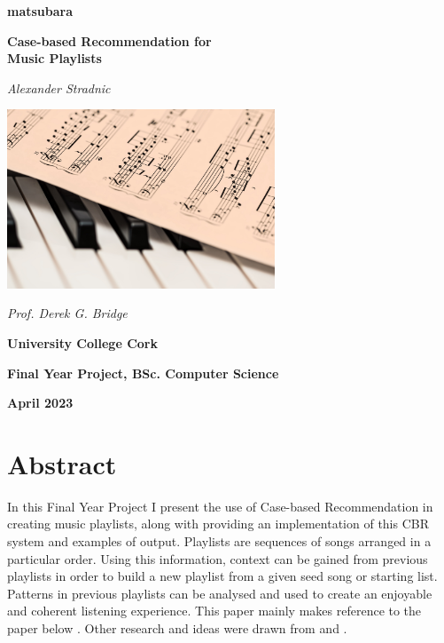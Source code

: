 \documentclass[a4paper, 12pt]{report}
\begin{document}
\begin{titlepage}
    \begin{center}
        \vspace*{1cm}

        \Large{
            \textbf{matsubara}
        
            \textbf{Case-based Recommendation for \\ Music Playlists}
        
            \vspace{0.5cm}
        
            \textit{Alexander Stradnic}
        
            \vspace{3cm}
        
            \includegraphics[width=0.6\textwidth]{piano.jpg}
        
            \vspace{3cm}
        
            \textit{Prof. Derek G. Bridge}
        
            \vspace{0.5cm}
        
            \textbf{University College Cork}
        
            \textbf{Final Year Project, BSc. Computer Science}
            
            \textbf{April 2023}
        }
    \end{center}
\end{titlepage}

\chapter*{Abstract}
In this Final Year Project I present the use of Case-based Recommendation in creating music playlists, 
along with providing an implementation of this CBR system and examples of output.
Playlists are sequences of songs arranged in a particular order. Using this information, 
context can be gained from previous playlists in order to build a new playlist from a given seed song or starting list. 
Patterns in previous playlists can be analysed and used to create an enjoyable and coherent listening experience.
This paper mainly makes reference to the paper below \cite{main}. 
Other research and ideas were drawn from \cite{constructive-adaptation} and \cite{cbr-general}.
\end{document}
